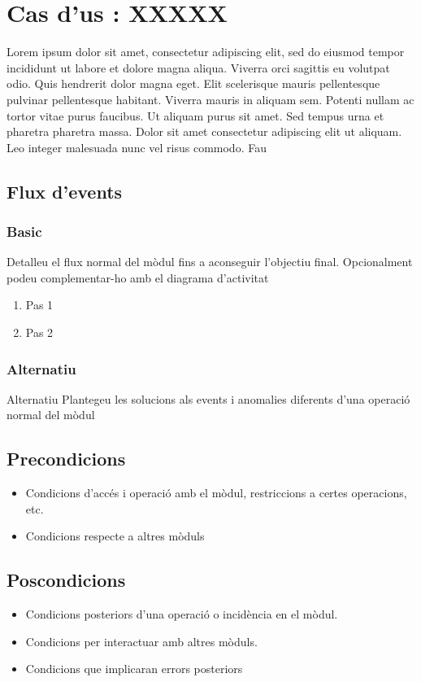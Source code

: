 \section{Cas d’us : XXXXX}\label{sec:uc0}

Lorem ipsum dolor sit amet, consectetur adipiscing elit, sed do eiusmod tempor incididunt ut labore et dolore magna aliqua. Viverra orci sagittis eu volutpat odio. Quis hendrerit dolor magna eget. Elit scelerisque mauris pellentesque pulvinar pellentesque habitant. Viverra mauris in aliquam sem. Potenti nullam ac tortor vitae purus faucibus. Ut aliquam purus sit amet. Sed tempus urna et pharetra pharetra massa. Dolor sit amet consectetur adipiscing elit ut aliquam. Leo integer malesuada nunc vel risus commodo. Fau

\subsection{Flux d’events}

\subsubsection{Basic}
Detalleu el flux normal del mòdul fins a aconseguir l'objectiu final. Opcionalment podeu complementar-ho amb el diagrama d'activitat

\begin{enumerate}
\item Pas 1
\item Pas 2
\end{enumerate}

  \subsubsection{Alternatiu}
Alternatiu
Plantegeu les solucions als events i anomalies diferents d'una operació normal del mòdul
\subsection{Precondicions}
\begin{itemize}
\item Condicions d'accés i operació amb el mòdul, restriccions a certes operacions, etc.
\item Condicions respecte a altres mòduls
\end{itemize}
\subsection{Poscondicions}
\begin{itemize}
\item Condicions posteriors d'una operació o incidència en el mòdul.
\item Condicions per interactuar amb altres mòduls.
\item Condicions que implicaran errors posteriors
\end{itemize}
